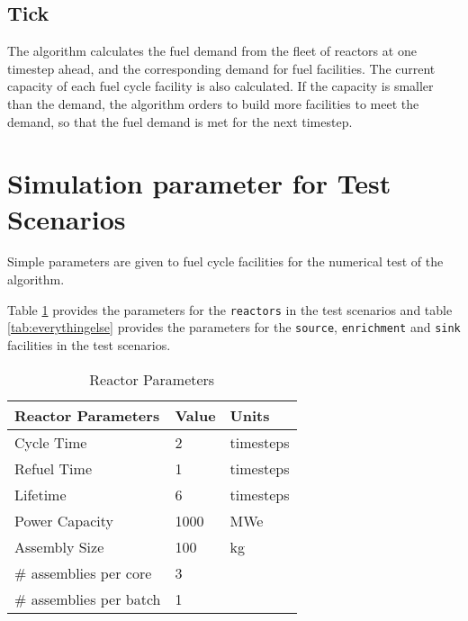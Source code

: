 \documentclass[11pt,letterpaper]{article}
\begin{document}
\subsection{Tick}
The algorithm calculates the fuel demand
from the fleet of reactors at one timestep ahead, and the corresponding demand for fuel facilities.
The current capacity of each fuel cycle facility is also calculated. If the capacity
is smaller than the demand, the algorithm orders to build more facilities to meet the demand,
so that the fuel demand is met for the next timestep.

\section{Simulation parameter for Test Scenarios}
Simple parameters are given to fuel cycle facilities for the numerical test of 
the algorithm.  

Table \ref{tab:reactor} provides the parameters for the \texttt{reactors} in the test scenarios and table \ref{tab:everythingelse} provides the parameters for the \texttt{source}, \texttt{enrichment} and \texttt{sink} facilities in the test scenarios.

\begin{table}[h]
    \centering
    \begin{tabularx}{\textwidth}{bbb}
       \hline
       Reactor Parameters & Value & Units \\
       \hline
       Cycle Time & 2 & timesteps \\
       Refuel Time & 1 & timesteps \\
       Lifetime & 6 & timesteps \\
       Power Capacity & 1000 & MWe \\
       Assembly Size & 100 & kg \\
       \# assemblies per core & 3 & \\
       \# assemblies per batch & 1 & \\
       \hline
    \end{tabularx}
    \caption {Reactor Parameters}
    \label{tab:reactor}
\end{table}
\end{document}
